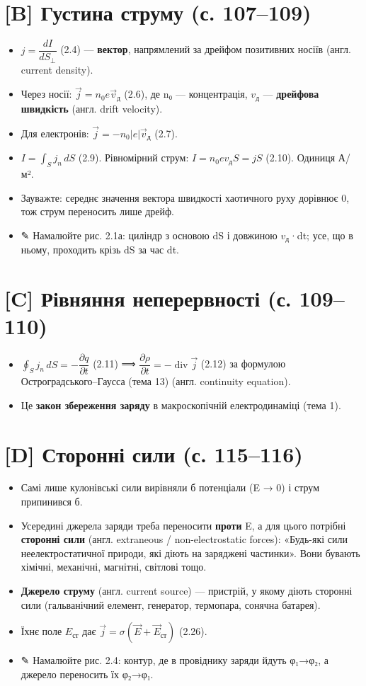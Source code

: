 \documentclass[11pt,a4paper,oneside]{book}
\newcommand{\pen}{{\sffamily\color{accent}✎}}
\begin{document}
\section*{[B] Густина струму (с. 107–109)}
\begin{itemize}
\item $j = \dfrac{dI}{dS_\perp}$ (2.4) — \textbf{вектор}, напрямлений за дрейфом позитивних носіїв (англ. current density).
\item Через носії: $\vec j = n_0 e\vec v_{\text{д}}$ (2.6), де n₀ — концентрація, $v_{\text{д}}$ — \textbf{дрейфова швидкість} (англ. drift velocity).
\item Для електронів: $\vec j = -n_0|e|\vec v_{\text{д}}$ (2.7).
\item $I = \int_S j_n\,dS$ (2.9). Рівномірний струм: $I = n_0ev_{\text{д}}S = jS$ (2.10). Одиниця А/м².
\item Зауважте: середнє значення вектора швидкості хаотичного руху дорівнює 0, тож струм переносить лише дрейф.
\item \pen{} Намалюйте рис. 2.1а: циліндр з основою dS і довжиною $v_{\text{д}}$·dt; усе, що в ньому, проходить крізь dS за час dt.
\end{itemize}

\section*{[C] Рівняння неперервності (с. 109–110)}
\begin{itemize}
\item $\oint_S j_n\,dS = -\dfrac{\partial q}{\partial t}$ (2.11) ⟹ $\dfrac{\partial\rho}{\partial t} = -\operatorname{div}\vec j$ (2.12) за формулою Остроградського–Гаусса (тема 13) (англ. continuity equation).
\item Це \textbf{закон збереження заряду} в макроскопічній електродинаміці (тема 1).
\end{itemize}

\section*{[D] Сторонні сили (с. 115–116)}
\begin{itemize}
\item Самі лише кулонівські сили вирівняли б потенціали (E → 0) і струм припинився б.
\item Усередині джерела заряди треба переносити \textbf{проти} E, а для цього потрібні \textbf{сторонні сили} (англ. extraneous / non-electrostatic forces): «Будь-які сили неелектростатичної природи, які діють на заряджені частинки». Вони бувають хімічні, механічні, магнітні, світлові тощо.
\item \textbf{Джерело струму} (англ. current source) — пристрій, у якому діють сторонні сили (гальванічний елемент, генератор, термопара, сонячна батарея).
\item Їхнє поле $E_{\text{ст}}$ дає $\vec j = \sigma(\vec E + \vec E_{\text{ст}})$ (2.26).
\item \pen{} Намалюйте рис. 2.4: контур, де в провіднику заряди йдуть φ₁→φ₂, а джерело переносить їх φ₂→φ₁.
\end{itemize}
\end{document}
